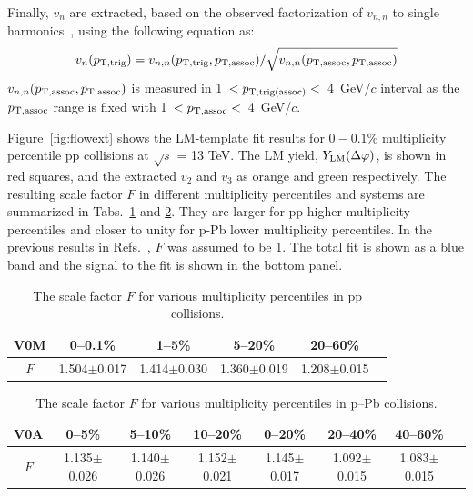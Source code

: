 Finally, $v_{n}$ are extracted, based on the observed factorization of $v_{n,n}$ to single harmonics~\cite{ATLAS:2015hzw,ATLAS:2016yzd}, using the following equation as:
\begin{eqnarray}
v_{n}(p_{\rm{T,trig}}) = v_{n,n}(p_{\rm{T,trig}}, p_{\rm{T,assoc}}) / \sqrt{ v_{n,n}(p_{\rm{T,assoc}},p_{\rm{T,assoc}})}
\end{eqnarray}
$v_{n,n}(p_{\rm{T,assoc}},p_{\rm{T,assoc}})$ is measured in 1~$<p_{\rm{T,trig(assoc)}}<$~4~GeV/$c$ interval as the $p_{\rm{T,assoc}}$ range is fixed with 1~$<p_{\rm{T,assoc}}<$~4~GeV/$c$.

Figure~\ref{fig:flowext} shows the LM-template fit results for $0-0.1\%$ multiplicity percentile pp collisions at $\sqrt{s}$ = 13 TeV. The LM yield,  $Y_{\rm{LM}}(\Delta\varphi)$, is shown in red squares, and the extracted $v_{2}$ and $v_{3}$ as orange and green respectively. The resulting scale factor $F$ in different multiplicity percentiles and systems are summarized in Tabs.~\ref{tab:Fpp} and \ref{tab:Fpb}. They are larger for pp higher multiplicity percentiles and closer to unity for p-Pb lower multiplicity percentiles. In the previous results in Refs.~\cite{ALICE:2012eyl, ALICE:2013snk}, $F$ was assumed to be 1. The total fit is shown as a blue band and the signal to the fit is shown in the bottom panel. 
\begin{table}[h!]
\caption{The scale factor $F$ for various multiplicity percentiles in pp collisions.}
\centering
\begin{tabular}{|c|cccc|c}
\hline
 V0M& 0--0.1\% & 1--5\% & 5--20\% & 20--60\% \\ 
 \hline
 $F$ & 1.504$\pm$0.017 & 1.414$\pm$0.030 & 1.360$\pm$0.019 & 1.208$\pm$0.015 \\  
 \hline
 \end{tabular}
 \label{tab:Fpp}
 
\end{table}

\begin{table}[h!]
\caption{The scale factor $F$ for various multiplicity percentiles in p--Pb collisions.}
\centering
\begin{tabular}{|c|cccccc|c}
 \hline
 V0A& 0--5\% & 5--10\% & 10--20\% & 0--20\% & 20--40\% & 40--60\% \\ 
 \hline
 $F$& 1.135$\pm$0.026 & 1.140$\pm$0.026 & 1.152$\pm$0.021 & 1.145$\pm$0.017 &1.092$\pm$0.015 & 1.083$\pm$0.015 \\  
 \hline
\end{tabular}
\label{tab:Fpb}
\end{table}

